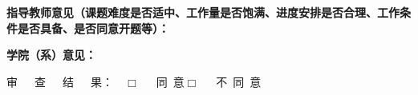 \newpage

\begin{SecBox}
    \textbf{指导教师意见（课题难度是否适中、工作量是否饱满、进度安排是否合理、工作条件是否具备、是否同意开题等）：}

    \vspace{19em}


    \vspace{1em}


    \vspace{4em}
\end{SecBox}

\begin{SecBox}
    \textbf{学院（系）意见：}

    \vspace{8em}

    审\ \ \ 查\ \ \ 结\ \ \ 果：\ \ $\Box$\ \ \ 同\ 意\qquad $\Box$\ \ \ 不\ 同\ 意

    \vspace{3em}
    

    \vspace{1em}

\end{SecBox}

\cleardoublepage[plain]%
